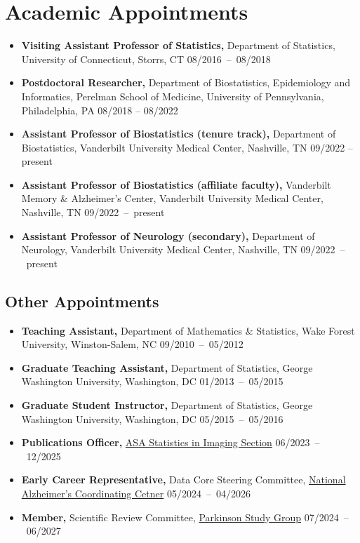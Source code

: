 \documentclass[12pt]{article}
\begin{document}
	\section*{Academic Appointments}
	\begin{itemize}
		\item {\bf Visiting Assistant Professor of Statistics,} 
		Department of Statistics, University of Connecticut, Storrs, 
		CT \hfill \mbox{08/2016 -- 08/2018} 
		\item {\bf Postdoctoral Researcher,} Department of 
		Biostatistics, Epidemiology and Informatics, Perelman School of Medicine, University of Pennsylvania, Philadelphia, PA \hfill 08/2018 -- 08/2022
		\item {\bf Assistant Professor of Biostatistics (tenure track),} Department of Biostatistics, Vanderbilt University Medical Center, Nashville, TN \hfill 09/2022 -- present
		\item {\bf Assistant Professor of Biostatistics (affiliate faculty),} Vanderbilt Memory \& Alzheimer's Center, Vanderbilt University Medical Center, Nashville, TN \hfill \mbox{09/2022 -- present}
		\item {\bf Assistant Professor of Neurology (secondary),} 
		Department of Neurology, Vanderbilt University Medical 
		Center, Nashville, TN \hfill \mbox{09/2022 -- present}
	\end{itemize}

	\subsection*{Other Appointments}
	\begin{itemize}
		\item {\bf Teaching Assistant,} Department of Mathematics \& Statistics, Wake Forest University, Winston-Salem, NC \hfill \mbox{09/2010 -- 05/2012}
		\item {\bf Graduate Teaching Assistant,} Department of 
		Statistics, George Washington University, Washington, DC 
		\hfill \mbox{01/2013 -- 05/2015}
		\item {\bf Graduate Student Instructor,} Department of 
		Statistics, George Washington University, Washington, DC 
		\hfill \mbox{05/2015 -- 05/2016}
		\item {\bf Publications Officer,} 
		\href{https://www.statsinimaging.org/}{ASA Statistics in 
		Imaging Section}
		\hfill \mbox{06/2023 -- 12/2025}
		\item {\bf Early Career Representative,} Data Core Steering 
		Committee, \href{https://naccdata.org/}{National Alzheimer's 
		Coordinating Cetner} \hfill \mbox{05/2024 -- 04/2026}
		\item {\bf Member,} Scientific Review Committee, 
		\href{https://parkinson-study-group.org/}{Parkinson Study 
		Group} \hfill \mbox{07/2024 -- 06/2027}
	\end{itemize}
\end{document}

